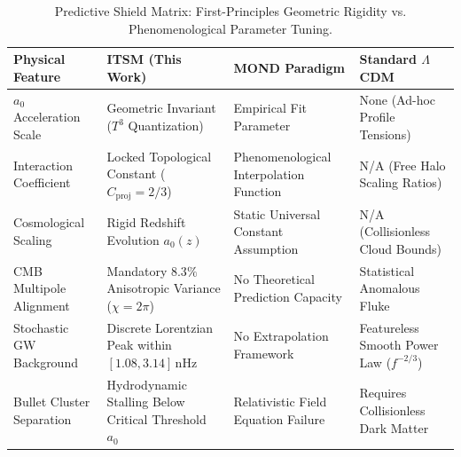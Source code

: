 \documentclass[aps,prd,10pt,onecolumn,superscriptaddress,nofootinbib]{revtex4-2}
\begin{document}
\begin{table}[htbp]
\caption{\label{tab:predictive_shield}Predictive Shield Matrix: First-Principles Geometric Rigidity vs. Phenomenological Parameter Tuning.}
\begin{ruledtabular}
\begin{tabular}{l|l|l|l}
\textbf{Physical Feature} & \textbf{ITSM (This Work)} & \textbf{MOND Paradigm} & \textbf{Standard $\Lambda$CDM} \\
\hline
$a_0$ Acceleration Scale & \parbox[t]{4.5cm}{Geometric Invariant ($T^3$ Quantization)\vspace{1.5mm}} & \parbox[t]{3.5cm}{Empirical Fit Parameter\vspace{1.5mm}} & \parbox[t]{4cm}{None (Ad-hoc Profile Tensions)\vspace{1.5mm}} \\ \hline
Interaction Coefficient & \parbox[t]{4.5cm}{Locked Topological Constant ($C_{\text{proj}} = 2/3$)\vspace{1.5mm}} & \parbox[t]{3.5cm}{Phenomenological Interpolation Function\vspace{1.5mm}} & \parbox[t]{4cm}{N/A (Free Halo Scaling Ratios)\vspace{1.5mm}} \\ \hline
Cosmological Scaling & \parbox[t]{4.5cm}{Rigid Redshift Evolution $a_0(z)$\vspace{1.5mm}} & \parbox[t]{3.5cm}{Static Universal Constant Assumption\vspace{1.5mm}} & \parbox[t]{4cm}{N/A (Collisionless Cloud Bounds)\vspace{1.5mm}} \\ \hline
CMB Multipole Alignment & \parbox[t]{4.5cm}{Mandatory $8.3\%$ Anisotropic Variance ($\chi=2\pi$)\vspace{1.5mm}} & \parbox[t]{3.5cm}{No Theoretical Prediction Capacity\vspace{1.5mm}} & \parbox[t]{4cm}{Statistical Anomalous Fluke\vspace{1.5mm}} \\ \hline
Stochastic GW Background & \parbox[t]{4.5cm}{Discrete Lorentzian Peak within $[1.08, 3.14]\,\text{nHz}$\vspace{1.5mm}} & \parbox[t]{3.5cm}{No Extrapolation Framework\vspace{1.5mm}} & \parbox[t]{4cm}{Featureless Smooth Power Law ($f^{-2/3}$)\vspace{1.5mm}} \\ \hline
Bullet Cluster Separation & \parbox[t]{4.5cm}{Hydrodynamic Stalling Below Critical Threshold $a_0$\vspace{1.5mm}} & \parbox[t]{3.5cm}{Relativistic Field Equation Failure\vspace{1.5mm}} & \parbox[t]{4cm}{Requires Collisionless Dark Matter\vspace{1.5mm}} \\ \hline

\end{tabular}
\end{ruledtabular}
\end{table}
\end{document}
